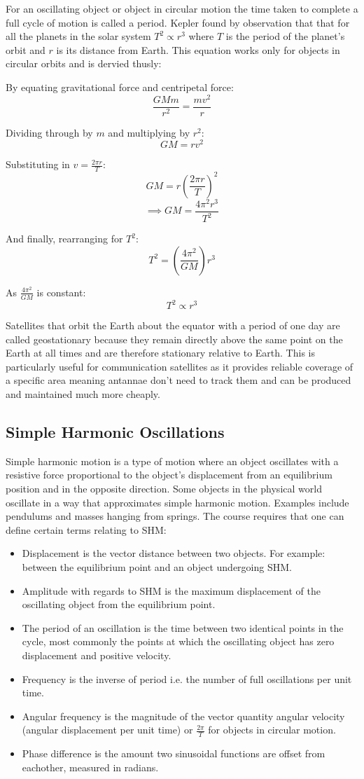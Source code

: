 \documentclass[a4,8pt]{article}
\begin{document}
For an oscillating object or object in circular motion the time taken to complete a full cycle of motion is called a period. Kepler found by observation that that for all the planets in the solar system $T^2 \propto r^3$ where $T$ is the period of the planet's orbit and $r$ is its distance from Earth. This equation works only for objects in circular orbits and is dervied thusly:

By equating gravitational force and centripetal force:
$$\frac{GMm}{r^2} = \frac{mv^2}{r}$$

Dividing through by $m$ and multiplying by $r^2$:
$$GM = rv^2$$

Substituting in $v = \frac{2 \pi r}{T}$:
$$GM = r\left(\frac{2 \pi r}{T}\right)^2$$
$$\implies GM = \frac{4 {\pi}^2 r^3}{T^2}$$

And finally, rearranging for $T^2$:
$$T^2 = \left(\frac{4 {\pi}^2}{GM}\right)r^3$$

As $\frac{4 {\pi}^2}{GM}$ is constant:
$$T^2 \propto r^3$$

Satellites that orbit the Earth about the equator with a period of one day are called geostationary because they remain directly above the same point on the Earth at all times and are therefore stationary relative to Earth. This is particularly useful for communication satellites as it provides reliable coverage of a specific area meaning antannae don't need to track them and can be produced and maintained much more cheaply.

\subsection{Simple Harmonic Oscillations}
Simple harmonic motion is a type of motion where an object oscillates with a resistive force proportional to the object's displacement from an equilibrium position and in the opposite direction. Some objects in the physical world oscillate in a way that approximates simple harmonic motion. Examples include pendulums and masses hanging from springs. The course requires that one can define certain terms relating to SHM:
\begin{itemize}
	\item Displacement is the vector distance between two objects. For example: between the equilibrium point and an object undergoing SHM.
	\item Amplitude with regards to SHM is the maximum displacement of the oscillating object from the equilibrium point.
	\item The period of an oscillation is the time between two identical points in the cycle, most commonly the points at which the oscillating object has zero displacement and positive velocity.
	\item Frequency is the inverse of period i.e. the number of full oscillations per unit time.
	\item Angular frequency is the magnitude of the vector quantity angular velocity (angular displacement per unit time) or $\frac{2\pi}{T}$ for objects in circular motion.
	\item Phase difference is the amount two sinusoidal functions are offset from eachother, measured in radians.
\end{itemize}
\end{document}
